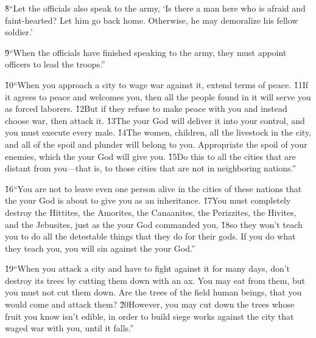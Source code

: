 \v{8}``Let the officials also speak to the army, `Is there a man here who is afraid and faint-hearted? Let him go back home. Otherwise, he may demoralize his fellow soldier.'

\v{9}``When the officials have finished speaking to the army, they must appoint officers to lead the troops.''

\v{10}``When you approach a city to wage war against it, extend terms of peace. \v{11}If it agrees to peace and welcomes you, then all the people found in it will serve you as forced laborers. \v{12}But if they refuse to make peace with you and instead choose war, then attack it. \v{13}The  your God will deliver it into your control, and you must execute every male. \v{14}The women, children, all the livestock in the city, and all of the spoil and plunder will belong to you. Appropriate the spoil of your enemies, which the  your God will give you. \v{15}Do this to all the cities that are distant from you---that is, to those cities that are not in neighboring nations.''

\v{16}``You are not to leave even one person alive in the cities of these nations that the  your God is about to give you as an inheritance. \v{17}You must completely destroy the Hittites, the Amorites, the Canaanites, the Perizzites, the Hivites, and the Jebusites, just as the  your God commanded you, \v{18}so they won't teach you to do all the detestable things that they do for their gods. If you do what they teach you, you will sin against the  your God.''

\v{19}``When you attack a city and have to fight against it for many days, don't destroy its trees by cutting them down with an ax. You may eat from them, but you must not cut them down. Are the trees of the field human beings, that you would come and attack them? \v{20}However, you may cut down the trees whose fruit you know isn't edible, in order to build siege works against the city that waged war with you, until it falls.''

